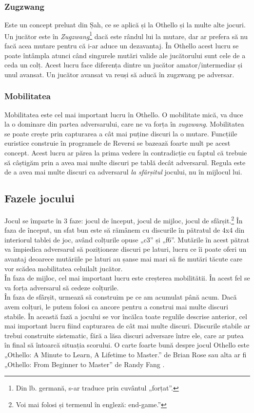 \documentclass[12pt,twoside,a4paper,fleqn]{book}
\theoremstyle{definition}
\begin{document}
\subsubsection{Zugzwang}
Este un concept preluat din Șah, ce se aplică și la Othello și la multe alte jocuri. Un jucător este în \emph{Zugzwang}\footnote{Din lb. germană, s-ar traduce prin cuvântul „forțat”.} dacă este rândul lui la mutare, dar ar prefera să nu facă acea mutare pentru că i-ar aduce un dezavantaj. În Othello acest lucru se poate întâmpla atunci când singurele mutări valide ale jucătorului sunt cele de a ceda un colț. Acest lucru face diferența dintre un jucător amator/intermediar și unul avansat. Un jucător avansat va reuși să aducă în zugzwang pe adversar.
\subsubsection{Mobilitatea}
Mobilitatea este cel mai important lucru în Othello. O mobilitate mică, va duce la o dominare din partea adversarului, care ne va forța în \emph{zugzwang}. Mobilitatea se poate crește prin capturarea a cât mai puține discuri la o mutare. Funcțiile euristice construie în programele de Reversi se bazează foarte mult pe acest concept. Acest lucru ar părea la prima vedere în contradicție cu faptul că trebuie să câștigăm prin a avea mai multe discuri pe tablă decât adversarul. Regula este de a avea mai multe discuri ca adversarul \emph{la sfârșitul} jocului, nu în mijlocul lui.
\subsection{Fazele jocului}
Jocul se împarte în $3$ faze: jocul de început, jocul de mijloc, jocul de sfârșit.\footnote{Voi mai folosi și termenul în engleză: end-game.”} În faza de început, un sfat bun \cite{othello_fang} este să rămânem cu discurile în pătratul de 4x4 din interiorul tablei de joc, având colțurile opuse „c3” și „f6”. Mutările în acest pătrat va împiedica adversarul să poziționeze discuri pe laturi, lucru ce îi poate oferi un avantaj deoarece mutăriile pe laturi au șanse mai mari să fie mutări tăcute care vor scădea mobilitatea celuilalt jucător.\\
În faza de mijloc, cel mai important lucru este creșterea mobilitătii. În acest fel se va forța adversarul să cedeze colțurile.\\
În faza de sfârșit, urmează să construim pe ce am acumulat până acum. Dacă avem colțuri, le putem folosi ca ancore pentru a construi mai multe discuri stabile. În această fază a jocului se vor încălca toate regulile descrise anterior, cel mai important lucru fiind capturarea de cât mai multe discuri. Discurile stabile ar trebui construite sistematic, fără a lăsa discuri adversare între ele, care ar putea în final să întoarcă situația scorului. O carte foarte bună despre jocul Othello este „Othello: A Minute to Learn, A Lifetime to Master.” de Brian Rose \cite{othello_master} sau alta ar fi „Othello: From Beginner to Master” de Randy Fang \cite{othello_fang}.

\tableofcontents
\end{document}
